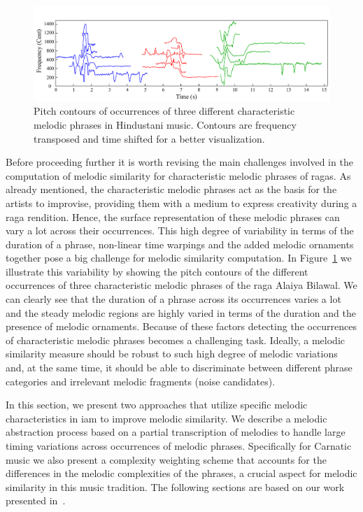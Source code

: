 \begin{figure}
	\begin{center}
		\includegraphics[width=\figSizeHundred]{ch06_patterns/figures/ImprovingSimilarity/phraseClassesExample.pdf}
	\end{center}
	\caption[Examples of different occurrences of the \gls{raga} motifs]{Pitch contours of occurrences of three different characteristic melodic phrases in Hindustani music. Contours are frequency transposed and time shifted for a better visualization.}
	\label{fig:phraseComplexityExample}
\end{figure}

Before proceeding further it is worth revising the main challenges involved in the computation of melodic similarity for characteristic melodic phrases of \glspl{raga}. As already mentioned, the characteristic melodic phrases act as the basis for the artists to improvise, providing them with a medium to express creativity during a \gls{raga} rendition. Hence, the surface representation of these melodic phrases can vary a lot across their occurrences. This high degree of variability in terms of the duration of a phrase, non-linear time warpings and the added melodic ornaments together pose a big challenge for melodic similarity computation. In Figure~\ref{fig:phraseComplexityExample} we illustrate this variability by showing the pitch contours of the different occurrences of three characteristic melodic phrases of the \gls{raga} Alaiya Bilawal. We can clearly see that the duration of a phrase across its occurrences varies a lot and the steady melodic regions are highly varied in terms of the duration and the presence of melodic ornaments. Because of these factors detecting the occurrences of characteristic melodic phrases becomes a challenging task. Ideally, a melodic similarity measure should be robust to such high degree of melodic variations and, at the same time, it should be able to discriminate between different phrase categories and irrelevant melodic fragments (noise candidates).

In this section, we present two approaches that utilize specific melodic characteristics in \gls{iam} to improve melodic similarity. We describe a melodic abstraction process based on a partial transcription of melodies to handle large timing variations across occurrences of melodic phrases. Specifically for Carnatic music we also present a complexity weighting scheme that accounts for the differences in the melodic complexities of the phrases, a crucial aspect for melodic similarity in this music tradition. The following sections are based on our work presented in~\cite{gulati_ISMIR_2015}.

